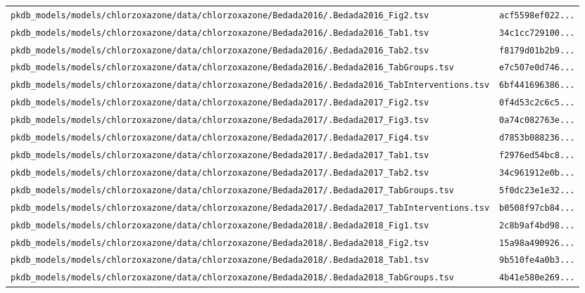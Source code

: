 \begin{longtable}{ll}
\texttt{pkdb\_models/models/chlorzoxazone/data/chlorzoxazone/Bedada2016/.Bedada2016\_Fig2.tsv} & \texttt{acf5598ef022...} \\
\texttt{pkdb\_models/models/chlorzoxazone/data/chlorzoxazone/Bedada2016/.Bedada2016\_Tab1.tsv} & \texttt{34c1cc729100...} \\
\texttt{pkdb\_models/models/chlorzoxazone/data/chlorzoxazone/Bedada2016/.Bedada2016\_Tab2.tsv} & \texttt{f8179d01b2b9...} \\
\texttt{pkdb\_models/models/chlorzoxazone/data/chlorzoxazone/Bedada2016/.Bedada2016\_TabGroups.tsv} & \texttt{e7c507e0d746...} \\
\texttt{pkdb\_models/models/chlorzoxazone/data/chlorzoxazone/Bedada2016/.Bedada2016\_TabInterventions.tsv} & \texttt{6bf441696386...} \\
\texttt{pkdb\_models/models/chlorzoxazone/data/chlorzoxazone/Bedada2017/.Bedada2017\_Fig2.tsv} & \texttt{0f4d53c2c6c5...} \\
\texttt{pkdb\_models/models/chlorzoxazone/data/chlorzoxazone/Bedada2017/.Bedada2017\_Fig3.tsv} & \texttt{0a74c082763e...} \\
\texttt{pkdb\_models/models/chlorzoxazone/data/chlorzoxazone/Bedada2017/.Bedada2017\_Fig4.tsv} & \texttt{d7853b088236...} \\
\texttt{pkdb\_models/models/chlorzoxazone/data/chlorzoxazone/Bedada2017/.Bedada2017\_Tab1.tsv} & \texttt{f2976ed54bc8...} \\
\texttt{pkdb\_models/models/chlorzoxazone/data/chlorzoxazone/Bedada2017/.Bedada2017\_Tab2.tsv} & \texttt{34c961912e0b...} \\
\texttt{pkdb\_models/models/chlorzoxazone/data/chlorzoxazone/Bedada2017/.Bedada2017\_TabGroups.tsv} & \texttt{5f0dc23e1e32...} \\
\texttt{pkdb\_models/models/chlorzoxazone/data/chlorzoxazone/Bedada2017/.Bedada2017\_TabInterventions.tsv} & \texttt{b0508f97cb84...} \\
\texttt{pkdb\_models/models/chlorzoxazone/data/chlorzoxazone/Bedada2018/.Bedada2018\_Fig1.tsv} & \texttt{2c8b9af4bd98...} \\
\texttt{pkdb\_models/models/chlorzoxazone/data/chlorzoxazone/Bedada2018/.Bedada2018\_Fig2.tsv} & \texttt{15a98a490926...} \\
\texttt{pkdb\_models/models/chlorzoxazone/data/chlorzoxazone/Bedada2018/.Bedada2018\_Tab1.tsv} & \texttt{9b510fe4a0b3...} \\
\texttt{pkdb\_models/models/chlorzoxazone/data/chlorzoxazone/Bedada2018/.Bedada2018\_TabGroups.tsv} & \texttt{4b41e580e269...} \\

\end{longtable}

